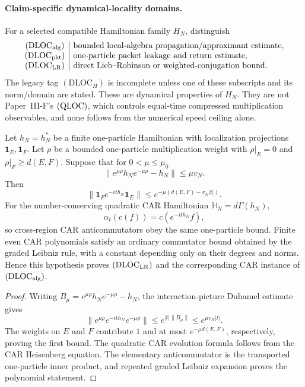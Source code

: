 \documentclass[12pt,a4paper]{article}
\begin{document}
\paragraph{Claim-specific dynamical-locality domains.}
For a selected compatible Hamiltonian family \(H_N\), distinguish
\[
\begin{array}{c|l}
(\mathrm{DLOC}_{\rm alg})
 & \text{bounded local-algebra propagation/approximant estimate},\\
(\mathrm{DLOC}_{\rm pkt})
 & \text{one-particle packet leakage and return estimate},\\
(\mathrm{DLOC}_{\rm LR})
 & \text{direct Lieb--Robinson or weighted-conjugation bound}.
\end{array}
\]
The legacy tag \((\mathrm{DLOC}_H)\) is incomplete unless one of these
subscripts and its norm/domain are stated.  These are dynamical properties of
\(H_N\).  They are not Paper~III-F's \(({\rm QLOC})\), which controls
equal-time compressed multiplication observables, and none follows from the
numerical speed ceiling alone.

\begin{theorem}
\label{p4:thm:weighted-conjugation-car-locality}
Let \(h_N=h_N^*\) be a finite one-particle Hamiltonian with localization
projections \(\mathbf1_E,\mathbf1_F\).  Let \(\rho\) be a bounded
one-particle multiplication weight with \(\rho|_E=0\) and
\(\rho|_F\ge d(E,F)\).  Suppose that for \(0<\mu\le\mu_0\)
\[
 \bigl\|e^{\mu\rho}h_Ne^{-\mu\rho}-h_N\bigr\|
 \le\mu v_N.
\]
Then
\[
 \boxed{\|\mathbf1_Fe^{-it h_N}\mathbf1_E\|
 \le e^{-\mu(d(E,F)-v_N|t|)}.}
\]
For the number-conserving quadratic CAR Hamiltonian
\(\mathbb H_N=d\Gamma(h_N)\),
\[
 \alpha_t(c(f))=c(e^{-it h_N}f),
\]
so cross-region CAR anticommutators obey the same one-particle bound.
Finite even CAR polynomials satisfy an ordinary commutator bound obtained by
the graded Leibniz rule, with a constant depending only on their degrees and
norms.  Hence this hypothesis proves
\((\mathrm{DLOC}_{\rm LR})\) and the corresponding CAR instance of
\((\mathrm{DLOC}_{\rm alg})\).
\end{theorem}

\begin{proof}
Writing \(B_\mu=e^{\mu\rho}h_Ne^{-\mu\rho}-h_N\), the interaction-picture
Duhamel estimate gives
\[
 \|e^{\mu\rho}e^{-it h_N}e^{-\mu\rho}\|
 \le e^{|t|\|B_\mu\|}
 \le e^{\mu v_N|t|}.
\]
The weights on \(E\) and \(F\) contribute \(1\) and at most
\(e^{-\mu d(E,F)}\), respectively, proving the first bound.  The quadratic
CAR evolution formula follows from the CAR Heisenberg equation.  The
elementary anticommutator is the transported one-particle inner product, and
repeated graded Leibniz expansion proves the polynomial statement.
\end{proof}
\end{document}
